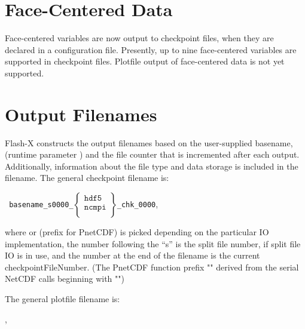 \section{Face-Centered Data}
Face-centered variables are now output to checkpoint files, when they are declared in a configuration file.  Presently, up to nine face-centered variables are supported in checkpoint files.  Plotfile output of face-centered data is not yet supported.

\section{Output Filenames}
\label{Sec:Output file names}


Flash-X constructs the output filenames%
based on the user-supplied basename, (runtime parameter )
and the file counter that is incremented after each output.
Additionally, information about the file type and data storage is
included in the filename.  The general checkpoint filename is:
\medskip

\texttt{
basename\_s0000\_$\left\{\begin{array}{c}\mathtt{hdf5}\\ \mathtt{ncmpi}\\
             \end{array}\right\}$\_chk\_0000}\enskip,
\medskip

\noindent
where  or  (prefix for PnetCDF) is picked
depending on the particular IO implementation, the number following the ``s'' is 
the split file number, if split file IO is in use, 
and the number at the end of the
filename is the current checkpointFileNumber.  (The PnetCDF function
prefix "" derived from the serial NetCDF calls beginning with
"")

The general plotfile filename is:
\medskip

\enskip,
\medskip



